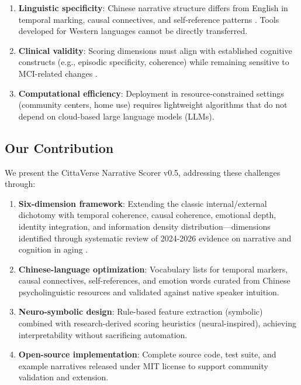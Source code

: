 \documentclass{article}
\begin{document}
\begin{enumerate}[label=(\arabic*)]
    \item \textbf{Linguistic specificity}: Chinese narrative structure differs from English in temporal marking, causal connectives, and self-reference patterns \cite{chen2021}. Tools developed for Western languages cannot be directly transferred.
    \item \textbf{Clinical validity}: Scoring dimensions must align with established cognitive constructs (e.g., episodic specificity, coherence) while remaining sensitive to MCI-related changes \cite{murphy2023}.
    \item \textbf{Computational efficiency}: Deployment in resource-constrained settings (community centers, home use) requires lightweight algorithms that do not depend on cloud-based large language models (LLMs).
\end{enumerate}

\subsection{Our Contribution}

We present the CittaVerse Narrative Scorer v0.5, addressing these challenges through:

\begin{enumerate}[label=(\arabic*)]
    \item \textbf{Six-dimension framework}: Extending the classic internal/external dichotomy \cite{levine2002} with temporal coherence, causal coherence, emotional depth, identity integration, and information density distribution---dimensions identified through systematic review of 2024-2026 evidence on narrative and cognition in aging \cite{shankar2026, yang2025, zhang2026}.
    \item \textbf{Chinese-language optimization}: Vocabulary lists for temporal markers, causal connectives, self-references, and emotion words curated from Chinese psycholinguistic resources and validated against native speaker intuition.
    \item \textbf{Neuro-symbolic design}: Rule-based feature extraction (symbolic) combined with research-derived scoring heuristics (neural-inspired), achieving interpretability without sacrificing automation.
    \item \textbf{Open-source implementation}: Complete source code, test suite, and example narratives released under MIT license to support community validation and extension.
\end{enumerate}
\end{document}
